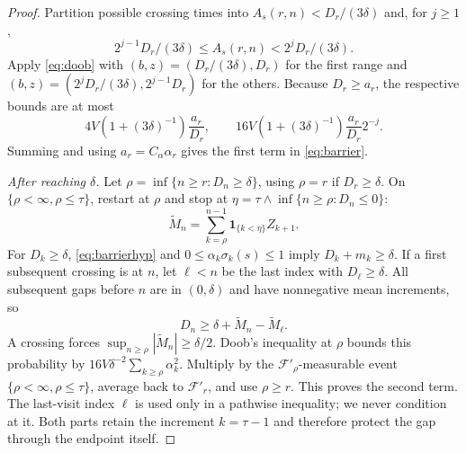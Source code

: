 \begin{proof}
Partition possible crossing times into $A_s(r,n)<D_r/(3\delta)$ and, for $j\ge1$,
\[
2^{j-1}D_r/(3\delta)\le A_s(r,n)<2^jD_r/(3\delta).
\]
Apply \eqref{eq:doob} with $(b,z)=(D_r/(3\delta),D_r)$ for the first range and $(b,z)=(2^jD_r/(3\delta),2^{j-1}D_r)$
for the others. Because $D_r\ge a_r$, the respective bounds are at most
\[
4V(1+(3\delta)^{-1})\frac{a_r}{D_r},\qquad
16V(1+(3\delta)^{-1})\frac{a_r}{D_r}2^{-j}.
\]
Summing and using $a_r=C_\alpha\alpha_r$ gives the first term in \eqref{eq:barrier}.

\emph{After reaching $\delta$.} Let $\rho=\inf\{n\ge r:D_n\ge\delta\}$, using $\rho=r$ if $D_r\ge\delta$. On $\{\rho<\infty,\rho\le\tau\}$,
restart at $\rho$ and stop at $\eta=\tau\wedge\inf\{n\ge\rho:D_n\le0\}$:
\[
\widetilde M_n=\sum_{k=\rho}^{n-1}\mathbf1_{\{k<\eta\}}Z_{k+1}.
\]
For $D_k\ge\delta$, \eqref{eq:barrierhyp} and $0\le\alpha_k\sigma_k(s)\le1$ imply $D_k+m_k\ge\delta$. If a first subsequent crossing is
at $n$, let $\ell<n$ be the last index with $D_\ell\ge\delta$. All subsequent gaps before $n$ are in $(0,\delta)$ and
have nonnegative mean increments, so
\[
D_n\ge\delta+\widetilde M_n-\widetilde M_\ell.
\]
A crossing forces $\sup_{n\ge\rho}|\widetilde M_n|\ge\delta/2$. Doob's inequality at $\rho$ bounds this probability by
$16V\delta^{-2}\sum_{k\ge\rho}\alpha_k^2$. Multiply by the $\mathcal F'_\rho$-measurable event $\{\rho<\infty,\rho\le\tau\}$, average back to $\mathcal F'_r$,
and use $\rho\ge r$. This proves the second term. The last-visit index $\ell$ is used only in a pathwise
inequality; we never condition at it. Both parts retain the increment $k=\tau-1$ and therefore
protect the gap through the endpoint itself.
\end{proof}

